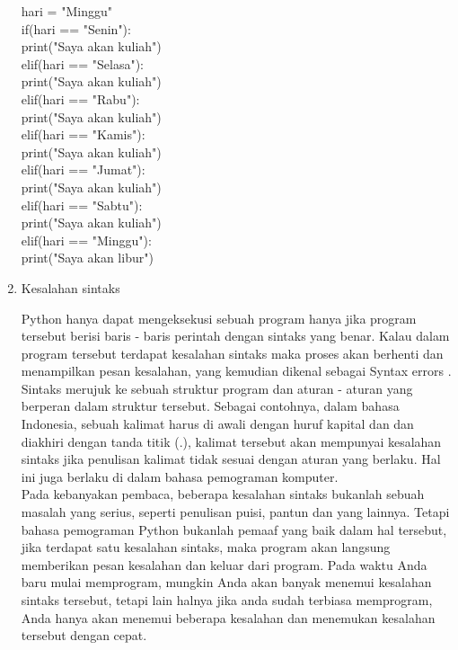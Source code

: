 \begin{enumerate}
hari = "Minggu"\\

if(hari == "Senin"):\\
    print("Saya akan kuliah")\\
elif(hari == "Selasa"):\\
    print("Saya akan kuliah")\\
elif(hari == "Rabu"):\\
    print("Saya akan kuliah")\\
elif(hari == "Kamis"):\\
    print("Saya akan kuliah")\\
elif(hari == "Jumat"):\\
    print("Saya akan kuliah")\\
elif(hari == "Sabtu"):\\
    print("Saya akan kuliah")\\
elif(hari == "Minggu"):\\
    print("Saya akan libur")\\


\item Kesalahan sintaks

Python hanya dapat mengeksekusi sebuah program hanya jika program tersebut
berisi baris - baris perintah dengan sintaks yang benar. Kalau dalam program
 tersebut terdapat kesalahan sintaks maka proses akan berhenti dan menampilkan 
pesan kesalahan, yang kemudian dikenal sebagai Syntax errors . Sintaks merujuk 
ke sebuah struktur program dan aturan - aturan yang berperan dalam struktur 
tersebut. Sebagai contohnya, dalam bahasa Indonesia, sebuah kalimat harus di 
awali dengan huruf kapital dan dan diakhiri dengan tanda titik (.), kalimat tersebut
akan mempunyai kesalahan sintaks jika penulisan kalimat tidak sesuai dengan aturan 
yang berlaku. Hal ini juga berlaku di dalam bahasa
pemograman komputer.\\

Pada kebanyakan pembaca, beberapa kesalahan sintaks bukanlah sebuah masalah
yang serius, seperti penulisan puisi, pantun dan yang lainnya. Tetapi bahasa pemograman
Python bukanlah pemaaf yang baik dalam hal tersebut, jika terdapat satu
kesalahan sintaks, maka program akan langsung memberikan pesan kesalahan dan
keluar dari program. Pada waktu Anda baru mulai memprogram, mungkin Anda
akan banyak menemui kesalahan sintaks tersebut, tetapi lain halnya jika anda sudah
terbiasa memprogram, Anda hanya akan menemui beberapa kesalahan dan
menemukan kesalahan tersebut dengan cepat.\\


\end{enumerate}
